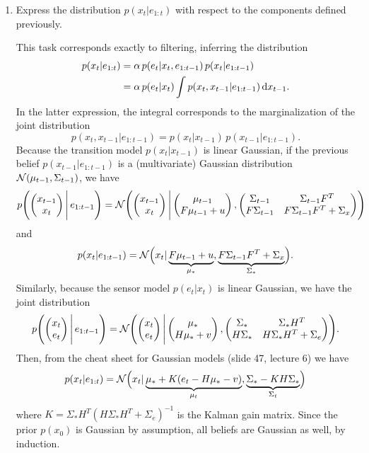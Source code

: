 \documentclass[11pt, a4paper]{article}
\begin{document}
\begin{enumerate}
    \item Express the distribution $p(x_t | e_{1:t})$ with respect to the components defined previously.

    \begin{solution}
        This task corresponds exactly to filtering, \ie{} inferring the distribution
        \begin{align*}
            p(x_t | e_{1:t}) & = \alpha \, p(e_t | x_t, e_{1:t-1}) \, p(x_t | e_{1:t-1}) \\
            & = \alpha \, p(e_t | x_t) \int p(x_t, x_{t-1} | e_{1:t-1}) \d{x_{t-1}} .
        \end{align*}
        In the latter expression, the integral corresponds to the marginalization of the joint distribution
        \begin{equation*}
            p(x_t, x_{t-1} | e_{1:t-1}) = p(x_t | x_{t-1}) \, p(x_{t-1} | e_{1:t-1}) .
        \end{equation*}
        Because the transition model $p(x_t | x_{t-1})$ is linear Gaussian, if the previous belief $p(x_{t-1} | e_{1:t-1})$ is a (multivariate) Gaussian distribution $\N(\mu_{t-1}, \Sigma_{t-1})$, we have
        \begin{equation*}
            p\rbk*{ \mat{x_{t-1} \\ x_t} \Bigg| \, e_{1:t-1} } = \N\rbk*{ \mat{x_{t-1} \\ x_t} \Bigg| \mat{\mu_{t-1} \\ F \mu_{t-1} + u}, \mat{ \Sigma_{t-1} & \Sigma_{t-1} F^T \\ F \Sigma_{t-1} & F \Sigma_{t-1} F^T + \Sigma_x } }
        \end{equation*}
        and
        \begin{equation*}
            p(x_t | e_{1:t-1}) = \N\rbk[\Big]{x_t | \underbrace{F \mu_{t-1} + u}_{\mu_*}, \underbrace{F \Sigma_{t-1} F^T + \Sigma_x}_{\Sigma_*} } .
        \end{equation*}
        Similarly, because the sensor model $p(e_t | x_t)$ is linear Gaussian, we have the joint distribution
        \begin{equation*}
            p\rbk*{ \mat{x_t \\ e_t} \Bigg| \, e_{1:t-1} } = \N\rbk*{ \mat{x_t \\ e_t} \Bigg| \mat{\mu_* \\ H \mu_* + v}, \mat{ \Sigma_* & \Sigma_* H^T \\ H \Sigma_* & H \Sigma_* H^T + \Sigma_e } }.
        \end{equation*}
        Then, from the cheat sheet for Gaussian models (slide 47, lecture 6) we have
        \begin{equation*}
            p(x_t | e_{1:t}) = \N\rbk[\Big]{x_t | \underbrace{\mu_* + K (e_t - H \mu_* - v)}_{\mu_t}, \underbrace{\Sigma_* - K H \Sigma_*}_{\Sigma_t} }
        \end{equation*}
        where $K = \Sigma_* H^T (H \Sigma_* H^T + \Sigma_e)^{-1}$ is the Kalman gain matrix. Since the prior $p(x_0)$ is Gaussian by assumption, all beliefs are Gaussian as well, by induction.
    \end{solution}


\end{enumerate}
\end{document}
